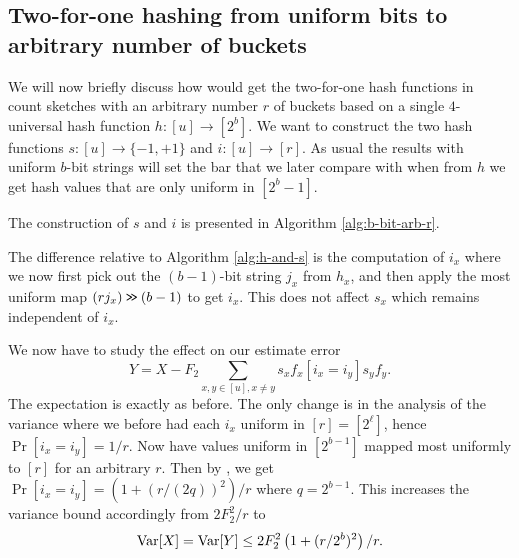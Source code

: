 \subsection{Two-for-one hashing from uniform bits to arbitrary number of buckets}
We will now briefly discuss how would get the two-for-one hash
functions in count sketches with an arbitrary number $r$ of buckets based
on a single $4$-universal hash function $h:[u]\to [2^b]$.  We want to
construct the two hash functions $s:[u]\to\{-1,+1\}$ and
$i:[u]\to[r]$. As usual the results with uniform $b$-bit strings will
set the bar that we later compare with when from $h$ we get hash values that
are only uniform in $[2^b-1]$.

The construction of $s$ and $i$ is presented in 
Algorithm \ref{alg:b-bit-arb-r}.
The difference relative to Algorithm \ref{alg:h-and-s} is the computation
of $i_x$ where we now first pick out the $(b-1)$-bit string $j_x$ from
$h_x$, and then apply the most uniform map $(rj_x)\mathbin{\texttt{>\!>}} (b-1)$
to get $i_x$. This does not affect $s_x$ which remains independent
of $i_x$. 

We now have to study the effect on our estimate error
\[Y=X-F_2\sum_{x,y\in[u],x\neq y} s_x f_x[i_x=i_y]s_y f_y.\]
The expectation is exactly as before. The only
change is in the analysis of the variance where
we before had each $i_x$ uniform in $[r]=[2^\ell]$, hence
$\Pr[i_x=i_y]=1/r$. Now have values uniform in $[2^{b-1}]$ mapped
most uniformly to $[r]$ for an arbitrary $r$. Then by ,
we get $\Pr[i_x=i_y]=\left(1+(r/(2q))^2\right)/r$ where $q=2^{b-1}$. 
This increases
the variance bound accordingly from $2F_2^2/r$ to
\begin{equation}\label{eq:Var-b-bit-arb-r}
   \operatorname*{Var}[X]=\operatorname*{Var}[Y]\leq 2F_2^2\left(1+(r/2^b)^2\right)/r.
\end{equation}

